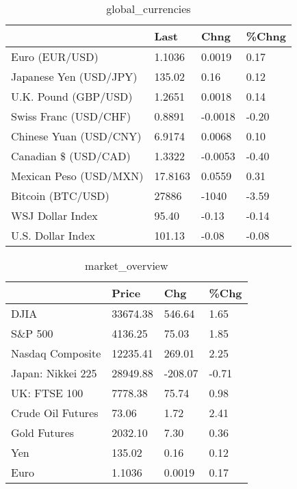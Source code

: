 \documentclass{article}%
\begin{document}
%


\begin{table}[htbp]%
\caption{global\_currencies}%
\centering%
\begin{adjustbox}{width=1\textwidth}%
\begin{tabular}{llll}
\toprule
                       &    Last &    Chng & \%Chng \\
\midrule
        Euro (EUR/USD) &  1.1036 &  0.0019 &  0.17 \\
Japanese Yen (USD/JPY) &  135.02 &    0.16 &  0.12 \\
  U.K. Pound (GBP/USD) &  1.2651 &  0.0018 &  0.14 \\
 Swiss Franc (USD/CHF) &  0.8891 & -0.0018 & -0.20 \\
Chinese Yuan (USD/CNY) &  6.9174 &  0.0068 &  0.10 \\
  Canadian \$ (USD/CAD) &  1.3322 & -0.0053 & -0.40 \\
Mexican Peso (USD/MXN) & 17.8163 &  0.0559 &  0.31 \\
     Bitcoin (BTC/USD) &   27886 &   -1040 & -3.59 \\
      WSJ Dollar Index &   95.40 &   -0.13 & -0.14 \\
     U.S. Dollar Index &  101.13 &   -0.08 & -0.08 \\
\bottomrule
\end{tabular}
%
\end{adjustbox}%
\end{table}

%


\begin{table}[htbp]%
\caption{market\_overview}%
\centering%
\begin{adjustbox}{width=1\textwidth}%
\begin{tabular}{llll}
\toprule
                  &    Price &     Chg &  \%Chg \\
\midrule
             DJIA & 33674.38 &  546.64 &  1.65 \\
          S\&P 500 &  4136.25 &   75.03 &  1.85 \\
 Nasdaq Composite & 12235.41 &  269.01 &  2.25 \\
Japan: Nikkei 225 & 28949.88 & -208.07 & -0.71 \\
     UK: FTSE 100 &  7778.38 &   75.74 &  0.98 \\
Crude Oil Futures &    73.06 &    1.72 &  2.41 \\
     Gold Futures &  2032.10 &    7.30 &  0.36 \\
              Yen &   135.02 &    0.16 &  0.12 \\
             Euro &   1.1036 &  0.0019 &  0.17 \\
\bottomrule
\end{tabular}
%
\end{adjustbox}%
\end{table}

%
\end{document}
